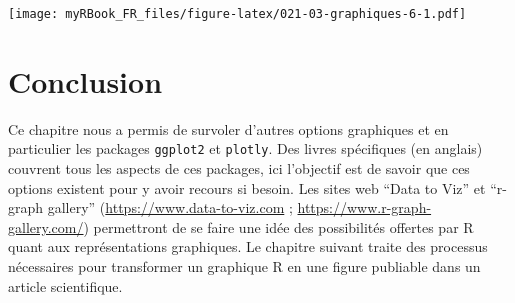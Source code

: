 \documentclass[
]{book}
\newenvironment{Shaded}{\begin{snugshade}}{\end{snugshade}}
\newcommand{\ControlFlowTok}[1]{\textcolor[rgb]{0.13,0.29,0.53}{\textbf{#1}}}
\newcommand{\DataTypeTok}[1]{\textcolor[rgb]{0.13,0.29,0.53}{#1}}
\newcommand{\KeywordTok}[1]{\textcolor[rgb]{0.13,0.29,0.53}{\textbf{#1}}}
\newcommand{\NormalTok}[1]{#1}
\newcommand{\OperatorTok}[1]{\textcolor[rgb]{0.81,0.36,0.00}{\textbf{#1}}}
\newcommand{\OtherTok}[1]{\textcolor[rgb]{0.56,0.35,0.01}{#1}}
\newcommand{\StringTok}[1]{\textcolor[rgb]{0.31,0.60,0.02}{#1}}
\begin{document}
\begin{Shaded}
\end{Shaded}

\texttt{[image: myRBook\_FR\_files/figure-latex/021-03-graphiques-6-1.pdf]}

\hypertarget{conclusion-10}{%
\section{Conclusion}\label{conclusion-10}}

Ce chapitre nous a permis de survoler d'autres options graphiques et en particulier les packages \texttt{ggplot2} et \texttt{plotly}. Des livres spécifiques (en anglais) couvrent tous les aspects de ces packages, ici l'objectif est de savoir que ces options existent pour y avoir recours si besoin. Les sites web ``Data to Viz'' et ``r-graph gallery'' (\url{https://www.data-to-viz.com} ; \url{https://www.r-graph-gallery.com/}) permettront de se faire une idée des possibilités offertes par R quant aux représentations graphiques. Le chapitre suivant traite des processus nécessaires pour transformer un graphique R en une figure publiable dans un article scientifique.
\end{document}
